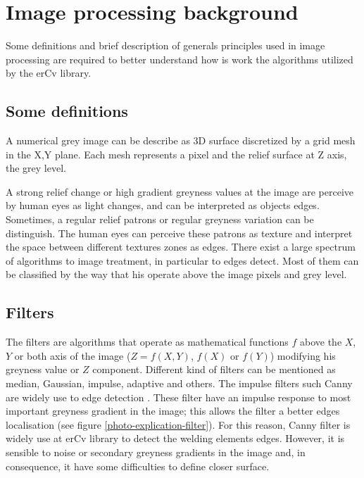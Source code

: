 \section{Image processing background}
\label{image_processing_background}

Some definitions and brief description of generals principles used in image processing are required to better understand how is work the algorithms utilized by the erCv library.

\subsection{Some definitions}
\label{some_definitions}

A numerical grey image can be describe as 3D surface discretized by a grid mesh in the X,Y plane. Each mesh represents a pixel and the relief surface at Z axis, the grey level.  

A strong relief change or high gradient greyness values at the image are perceive by human eyes as light changes, and can be interpreted as objects edges. 
Sometimes, a regular relief patrons or regular greyness variation can be distinguish. The human eyes can perceive these patrons as texture and interpret the space between different textures zones as edges.
There exist a large spectrum of algorithms to image treatment, in particular to edges detect. Most of them can be classified by the way that his operate above the image pixels and grey level.


\subsection{Filters}
\label{filters}

The filters are algorithms that operate as mathematical functions $f$ above the $X$, $Y$ or both axis of the image ($Z = f(X,Y)$,  $f(X)$ or $f(Y)$)  modifying his greyness value or $Z$ component. 
Different kind of filters can be mentioned as median, Gaussian, impulse, adaptive and others. The impulse filters such Canny are widely use to edge detection \cite{COCQUEREZ}. These filter have an impulse response to most important greyness gradient in the image; this allows the filter a better edges localisation (see figure \ref{photo-explication-filter}). For this reason, Canny filter is widely use at erCv library to detect the welding elements edges. However, it is sensible to noise or secondary greyness gradients in the image and, in consequence, it have some difficulties to define closer surface.

